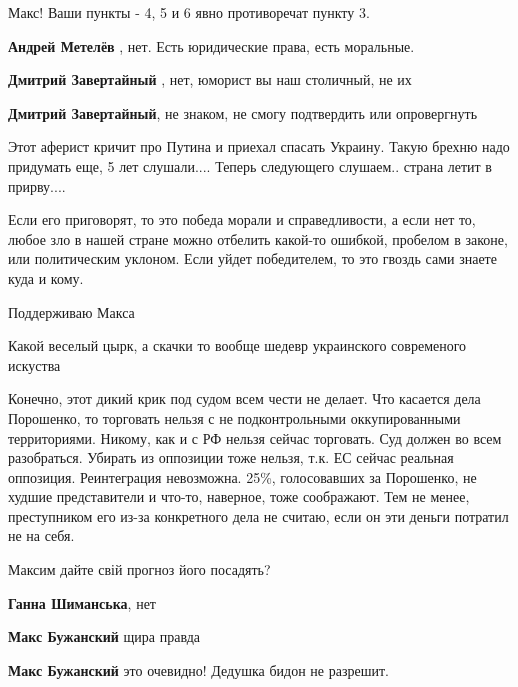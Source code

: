 \begin{itemize}
Макс! Ваши пункты - 4, 5 и 6 явно противоречат пункту 3.

\begin{itemize} %
\textbf{Андрей Метелёв} , нет.
Есть юридические права, есть моральные.

\textbf{Дмитрий Завертайный} , нет, юморист вы наш столичный, не их

\textbf{Дмитрий Завертайный}, не знаком, не смогу подтвердить или опровергнуть
\end{itemize} %


Этот аферист кричит про Путина и приехал спасать Украину. Такую брехню надо
придумать еще, 5 лет слушали.... Теперь следующего слушаем.. страна летит в
прирву....



Если его приговорят, то это победа морали и справедливости, а если нет то,
любое зло в нашей стране можно отбелить какой-то ошибкой, пробелом в законе,
или политическим уклоном. Если уйдет победителем, то это гвоздь сами знаете
куда и кому.


Поддерживаю Макса

Какой веселый цырк, а скачки то вообще шедевр украинского современого искуства


Конечно, этот дикий крик под судом всем чести не делает. Что касается дела
Порошенко, то торговать нельзя с не подконтрольными оккупированными
территориями. Никому, как и с РФ нельзя сейчас торговать. Суд должен во всем
разобраться. Убирать из оппозиции тоже нельзя, т.к. ЕС сейчас реальная
оппозиция. Реинтеграция невозможна. 25\%, голосовавших за Порошенко, не худшие
представители и что-то, наверное, тоже соображают. Тем не менее, преступником
его из-за конкретного дела не считаю, если он эти деньги потратил не на себя.

Максим дайте свій прогноз його посадять?

\begin{itemize} %
\textbf{Ганна Шиманська}, нет

\textbf{Макс Бужанский} щира правда

\textbf{Макс Бужанский} это очевидно! Дедушка бидон не разрешит.


\end{itemize}
\end{itemize}

